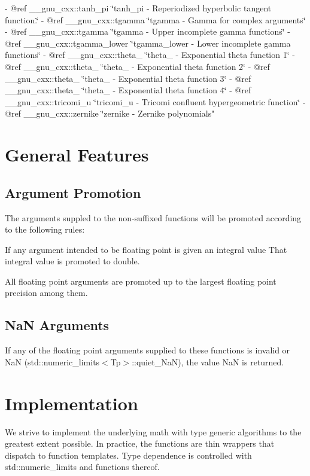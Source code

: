 \begin{DoxyItemize}
-\/ @ref \+\_\+\+\_\+gnu\+\_\+cxx\+::tanh\+\_\+pi \char`\"{}tanh\+\_\+pi -\/ Reperiodized hyperbolic tangent function.\char`\"{}
-\/ @ref \+\_\+\+\_\+gnu\+\_\+cxx\+::tgamma \char`\"{}tgamma -\/ Gamma for complex arguments\char`\"{}
-\/ @ref \+\_\+\+\_\+gnu\+\_\+cxx\+::tgamma \char`\"{}tgamma -\/ Upper incomplete gamma functions\char`\"{}
-\/ @ref \+\_\+\+\_\+gnu\+\_\+cxx\+::tgamma\+\_\+lower \char`\"{}tgamma\+\_\+lower -\/ Lower incomplete gamma functions\char`\"{}
-\/ @ref \+\_\+\+\_\+gnu\+\_\+cxx\+::theta\+\_ \char`\"{}theta\+\_ -\/ Exponential theta function 1\char`\"{}
-\/ @ref \+\_\+\+\_\+gnu\+\_\+cxx\+::theta\+\_ \char`\"{}theta\+\_ -\/ Exponential theta function 2\char`\"{}
-\/ @ref \+\_\+\+\_\+gnu\+\_\+cxx\+::theta\+\_ \char`\"{}theta\+\_ -\/ Exponential theta function 3\char`\"{}
-\/ @ref \+\_\+\+\_\+gnu\+\_\+cxx\+::theta\+\_ \char`\"{}theta\+\_ -\/ Exponential theta function 4\char`\"{}
-\/ @ref \+\_\+\+\_\+gnu\+\_\+cxx\+::tricomi\+\_\+u \char`\"{}tricomi\+\_\+u -\/ Tricomi confluent hypergeometric function\char`\"{}
-\/ @ref \+\_\+\+\_\+gnu\+\_\+cxx\+::zernike \char`\"{}zernike -\/ Zernike polynomials"
\end{DoxyItemize}\hypertarget{index_general}{}\section{General Features}\label{index_general}
\hypertarget{index_promotion}{}\subsection{Argument Promotion}\label{index_promotion}
The arguments suppled to the non-\/suffixed functions will be promoted according to the following rules\+:
\begin{DoxyEnumerate}
\item If any argument intended to be floating point is given an integral value That integral value is promoted to double.
\item All floating point arguments are promoted up to the largest floating point precision among them.
\end{DoxyEnumerate}\hypertarget{index_NaN}{}\subsection{Na\+N Arguments}\label{index_NaN}
If any of the floating point arguments supplied to these functions is invalid or NaN (std\+::numeric\+\_\+limits$<$\+Tp$>$\+::quiet\+\_\+\+NaN), the value NaN is returned.\hypertarget{index_impl}{}\section{Implementation}\label{index_impl}
We strive to implement the underlying math with type generic algorithms to the greatest extent possible. In practice, the functions are thin wrappers that dispatch to function templates. Type dependence is controlled with std\+::numeric\+\_\+limits and functions thereof.

